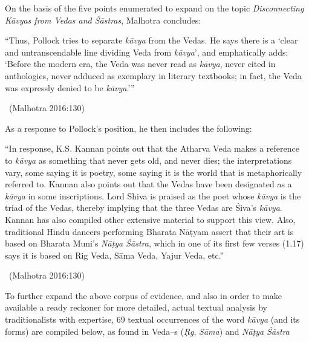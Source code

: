 On the basis of the five points enumerated to expand on the topic \textit{Disconnecting Kāvyas from Vedas and Śāstras}, Malhotra concludes:

\begin{myquote}
 “Thus, Pollock tries to separate \textit{kāvya} from the Vedas. He says there is a ‘clear and untranscendable line dividing Veda from \textit{kāvya}’, and emphatically adds: ‘Before the modern era, the Veda was never read as \textit{kāvya}, never cited in anthologies, never adduced as exemplary in literary textbooks; in fact, the Veda was expressly denied to be \textit{kāvya}.’” 

~\hfill (Malhotra 2016:130)
\end{myquote}

As a response to Pollock’s position, he then includes the following:

\begin{myquote}
“In response, K.S. Kannan points out that the Atharva Veda makes a reference to \textit{kāvya} as something that never gets old, and never dies; the interpretations vary, some saying it is poetry, some saying it is the world that is metaphorically referred to. Kannan also points out that the Vedas have been designated as a \textit{kāvya} in some inscriptions. Lord Shiva is praised as the poet whose \textit{kāvya} is the triad of the Vedas, thereby implying that the three Vedas are Śiva’s \textit{kāvya}. Kannan has also compiled other extensive material to support this view. Also, traditional Hindu dancers performing Bharata Nāṭyam assert that their art is based on Bharata Muni’s \textit{Nāṭya Śāstra}, which in one of its first few verses (1.17) says it is based on Rig Veda, Sāma Veda, Yajur Veda, etc.” 

~\hfill (Malhotra 2016:130)
\end{myquote}

To further expand the above corpus of evidence, and also in order to make available a ready reckoner for more detailed, actual textual analysis by traditionalists with expertise, 69 textual occurrences of the word \textit{kāvya} (and its forms) are compiled below, as found in Veda–s (\textit{Ṛg}, \textit{Sāma}) and \textit{Nāṭya Śāstra}

